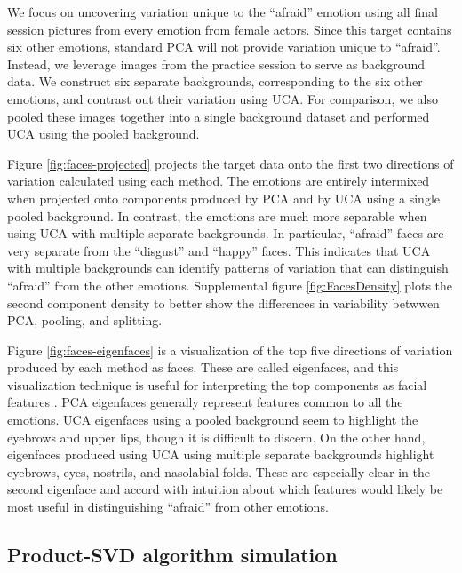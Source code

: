 \documentclass[nocrop]{bioinfo}
\begin{document}
\begin{methods}
We focus on uncovering variation unique to the ``afraid'' emotion using all final session pictures from every emotion from female actors. Since this target contains six other emotions, standard PCA will not provide variation unique to ``afraid''. Instead, we leverage images from the practice session to serve as background data. We construct six separate backgrounds, corresponding to the six other emotions, and contrast out their variation using UCA. For comparison, we also pooled these images together into a single background dataset and performed UCA using the pooled background.



Figure \ref{fig:faces-projected} projects the target data onto the first two directions of variation calculated using each method. The emotions are entirely intermixed when projected onto components produced by PCA and by UCA using a single pooled background. In contrast, the emotions are much more separable when using UCA with multiple separate backgrounds. In particular, ``afraid'' faces are very separate from the ``disgust'' and ``happy'' faces. This indicates that UCA with multiple backgrounds can identify patterns of variation that can distinguish ``afraid'' from the other emotions. Supplemental figure \ref{fig:FacesDensity} plots the second component density to better show the differences in variability betwwen PCA, pooling, and splitting.

Figure \ref{fig:faces-eigenfaces} is a visualization of the top five directions of variation produced by each method as faces. These are called eigenfaces, and this visualization technique is useful for interpreting the top components as facial features \cite{turk1991eigenfaces}. PCA eigenfaces generally represent features common to all the emotions. UCA eigenfaces using a pooled background seem to highlight the eyebrows and upper lips, though it is difficult to discern. On the other hand, eigenfaces produced using UCA using multiple separate backgrounds highlight eyebrows, eyes, nostrils, and nasolabial folds. These are especially clear in the second eigenface and accord with intuition about which features would likely be most useful in distinguishing ``afraid'' from other emotions.


\subsection{\label{sec:product-svd} Product-SVD algorithm simulation}


\end{methods}
\end{document}
